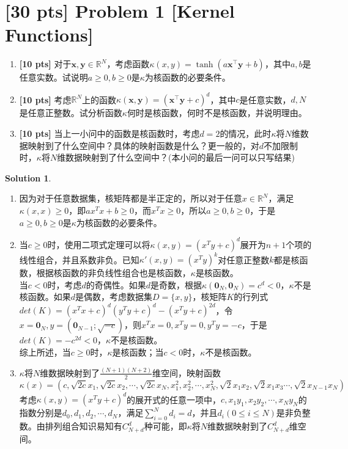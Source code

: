 \documentclass[a4paper,UTF8]{article}
\theoremstyle{definition}
\newtheorem*{solution}{Solution}
\begin{document}
\newpage

\section*{\textbf{[30 pts]} Problem 1 [Kernel Functions]}

\begin{enumerate}[(1)]
	\item \textbf{[10 pts]} 对于$\bm{x},\bm{y} \in \mathbb{R}^N$，考虑函数$\kappa(x,y) = \tanh( a \bm{x}^\top \bm{y} + b)$，其中$a,b$是任意实数。试说明$a \geq 0,b \geq 0$是$\kappa$为核函数的必要条件。
	\item \textbf{[10 pts]} 考虑$ \mathbb{R}^N $上的函数$ \kappa(\bm{x},\bm{y}) = (\bm{x}^\top \bm{y} + c)^d $，其中$c$是任意实数，$d,N$是任意正整数。试分析函数$\kappa$何时是核函数，何时不是核函数，并说明理由。
	\item \textbf{[10 pts]} 当上一小问中的函数是核函数时，考虑$d=2$的情况，此时$\kappa$将$N$维数据映射到了什么空间中？具体的映射函数是什么？更一般的，对$d$不加限制时，$\kappa$将$N$维数据映射到了什么空间中？(本小问的最后一问可以只写结果)
\end{enumerate}

\begin{solution}
	~\\
	\begin{enumerate}[(1)]
	\item 
	因为对于任意数据集，核矩阵都是半正定的，所以对于任意$x\in \mathbb{R}^N$，满足$\kappa(x,x)\geq0$，即$ax^Tx+b\geq0$，而$x^Tx\geq0$，所以$a\geq0,b\geq0$，于是$a\geq0,b\geq0$是$\kappa$为核函数的必要条件。
	\item 
	当$c\geq0$时，使用二项式定理可以将$\kappa(x,y)=(x^Ty+c)^d$展开为$n+1$个项的线性组合，并且系数非负。已知$\kappa'(x,y)=(x^Ty)^k$对任意正整数$k$都是核函数，根据核函数的非负线性组合也是核函数，$\kappa$是核函数。\\
	当$c<0$时，考虑$d$的奇偶性。如果$d$是奇数，根据$\kappa(\bm{0}_N,\bm{0}_N)=c^d<0$，$\kappa$不是核函数。如果$d$是偶数，考虑数据集$D=\{x,y\}$，核矩阵$K$的行列式$det(K)=(x^Tx+c)^d(y^Ty+c)^d-(x^Ty+c)^{2d}$，令$x=\bm{0}_N,y=(\bm{0}_{N-1};\sqrt{-c})$，则$x^Tx=0,x^Ty=0,y^Ty=-c$，于是$det(K)=-c^{2d}<0$，$\kappa$不是核函数。\\
	综上所述，当$c\geq0$时，$\kappa$是核函数；当$c<0$时，$\kappa$不是核函数。
	\item 
	$\kappa$将$N$维数据映射到了$\frac{(N+1)(N+2)}{2}$维空间，映射函数
	\[\kappa(x)=(c,\sqrt{2c}x_1,\sqrt{2c}x_2,\cdots,\sqrt{2c}x_N,x_1^2,x_2^2,\cdots,x_N^2,\sqrt{2}x_1x_2,\sqrt{2}x_1x_3\cdots,\sqrt{2}x_{N-1}x_N)\]
	考虑$\kappa(x,y)=(x^Ty+c)^d$的展开式的任意一项中，$c,x_1y_1,x_2y_2,\cdots,x_Ny_N$的指数分别是$d_0,d_1,d_2,\cdots,d_N$，满足$\sum_{i=0}^{N}d_i=d$，并且$d_i(0\leq i\leq N)$是非负整数。由排列组合知识易知有$C_{N+d}^d$种可能，即$\kappa$将$N$维数据映射到了$C_{N+d}^d$维空间。
	\end{enumerate}
\end{solution}
\end{document}
